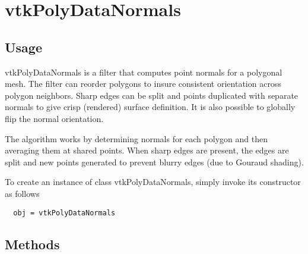 \section{vtkPolyDataNormals}

\subsection{Usage}

 vtkPolyDataNormals is a filter that computes point normals for a polygonal 
 mesh. The filter can reorder polygons to insure consistent orientation
 across polygon neighbors. Sharp edges can be split and points duplicated
 with separate normals to give crisp (rendered) surface definition. It is
 also possible to globally flip the normal orientation.

 The algorithm works by determining normals for each polygon and then
 averaging them at shared points. When sharp edges are present, the edges
 are split and new points generated to prevent blurry edges (due to 
 Gouraud shading).

To create an instance of class vtkPolyDataNormals, simply
invoke its constructor as follows
\begin{verbatim}
  obj = vtkPolyDataNormals
\end{verbatim}
\subsection{Methods}

